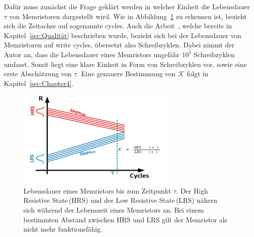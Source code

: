   Dafür muss zunächst die Frage geklärt werden in welcher Einheit die Lebensdauer $\tau$ von Memristoren dargestellt wird. Wie in Abbildung~\ref{fig:lebensdauer_chapter3} zu erkennen ist, bezieht sich die Zeitachse auf sogenannte \glqq cycles\grqq. Auch die Arbeit~\cite{nonvolatile}, welche bereits in Kapitel~\ref{sec:Qualität} beschrieben wurde, bezieht sich bei der Lebensdauer von Memristoren auf \glqq write cycles\grqq, übersetzt also \glqq Schreibzyklen\grqq. Dabei nimmt der Autor an, dass die Lebensdauer eines Memristors ungefähr $10^5$ Schreibzyklen umfasst. Somit liegt eine klare Einheit in Form von Schreibzyklen
  vor, sowie eine erste Abschätzung von $\tau$. Eine genauere Bestimmung von $\mathcal{K}$ folgt in Kapitel~\ref{sec:Chapter4}.

  \begin{figure}
    \centering
      \includegraphics[width=0.7\textwidth]{images/Lebensdauer_Graph.jpg}
    \caption{Lebensdauer eines Memristors bis zum Zeitpunkt $\tau$. Der \glqq High Resistive State\grqq\,(HRS) und der \glqq Low Resistive State\grqq\,(LRS) nähern sich während der Lebenszeit eines Memristors an. Bei einem bestimmten Abstand zwischen HRS und LRS gilt der Memristor als nicht mehr funktionsfähig.}
    \label{fig:lebensdauer_chapter3}
  \end{figure}

